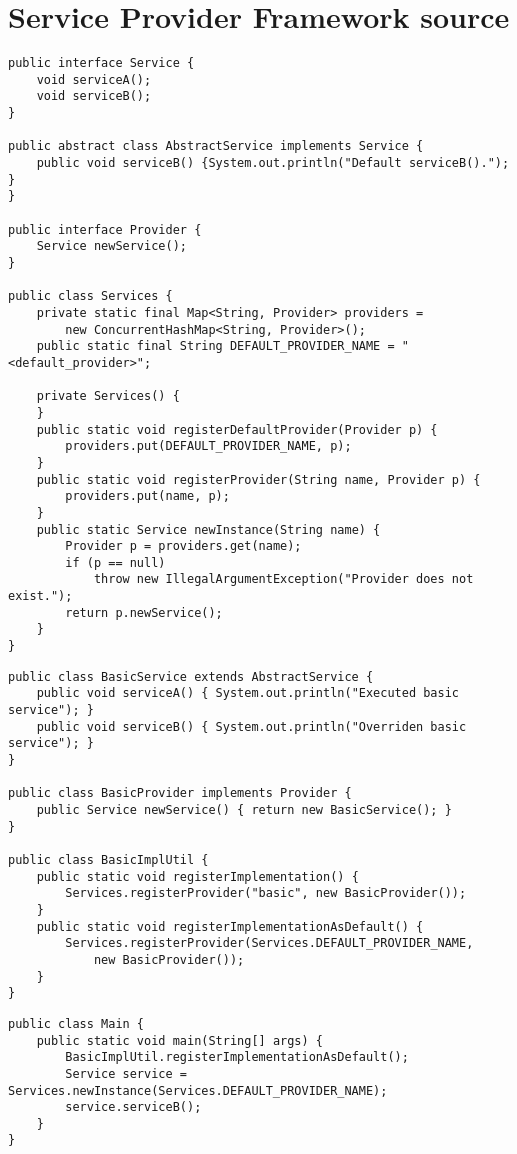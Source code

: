 \appendix
\chapter{Service Provider Framework source}
\label{examplesource}

\begin{lstlisting}[caption=Classes of the \code{service} package]
public interface Service {
	void serviceA();
	void serviceB();
}

public abstract class AbstractService implements Service {
	public void serviceB() {System.out.println("Default serviceB()."); }
}

public interface Provider {
	Service newService();
}

public class Services {
	private static final Map<String, Provider> providers = 
		new ConcurrentHashMap<String, Provider>();
	public static final String DEFAULT_PROVIDER_NAME = "<default_provider>";
	
	private Services() {
	}
	public static void registerDefaultProvider(Provider p) { 
		providers.put(DEFAULT_PROVIDER_NAME, p); 
	}
	public static void registerProvider(String name, Provider p) { 
		providers.put(name, p); 
	}
	public static Service newInstance(String name) {
		Provider p = providers.get(name);
		if (p == null) 
			throw new IllegalArgumentException("Provider does not exist.");
		return p.newService();
	}
}
\end{lstlisting}

\begin{lstlisting}[caption=Classes of the \code{impl} package]
public class BasicService extends AbstractService {
	public void serviceA() { System.out.println("Executed basic service"); }
	public void serviceB() { System.out.println("Overriden basic service"); }
} 

public class BasicProvider implements Provider {
	public Service newService() { return new BasicService(); }
}

public class BasicImplUtil {
	public static void registerImplementation() { 
		Services.registerProvider("basic", new BasicProvider()); 
	}
	public static void registerImplementationAsDefault() { 
		Services.registerProvider(Services.DEFAULT_PROVIDER_NAME, 
			new BasicProvider()); 
	}
}
\end{lstlisting}

\begin{lstlisting}[caption=Classes of the \code{client} package]
public class Main {
	public static void main(String[] args) {
		BasicImplUtil.registerImplementationAsDefault();
		Service service = Services.newInstance(Services.DEFAULT_PROVIDER_NAME);
		service.serviceB();
	}
}
\end{lstlisting}
